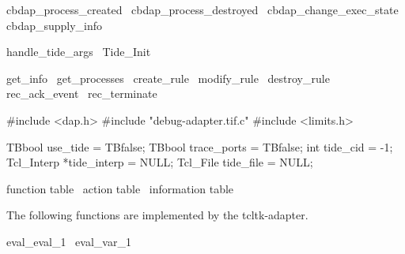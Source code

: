 \LA{}cbdap_process_created~{\nwtagstyle{}}\RA{}
\LA{}cbdap_process_destroyed~{\nwtagstyle{}}\RA{}
\LA{}cbdap_change_exec_state~{\nwtagstyle{}}\RA{}
\LA{}cbdap_supply_info~{\nwtagstyle{}}\RA{}

\LA{}handle_tide_args~{\nwtagstyle{}}\RA{}
\LA{}Tide_Init~{\nwtagstyle{}}\RA{}

\LA{}get_info~{\nwtagstyle{}}\RA{}
\LA{}get_processes~{\nwtagstyle{}}\RA{}
\LA{}create_rule~{\nwtagstyle{}}\RA{}
\LA{}modify_rule~{\nwtagstyle{}}\RA{}
\LA{}destroy_rule~{\nwtagstyle{}}\RA{}
\LA{}rec_ack_event~{\nwtagstyle{}}\RA{}
\LA{}rec_terminate~{\nwtagstyle{}}\RA{}
\nwendcode{}\nwdocspar


\nwenddocs{}\endmoddef
#include <dap.h>
#include "debug-adapter.tif.c"
#include <limits.h>
\nwendcode{}\nwdocspar


\nwenddocs{}\endmoddef
TBbool use_tide = TBfalse;
TBbool trace_ports = TBfalse;
int tide_cid = -1;
Tcl_Interp *tide_interp = NULL;
Tcl_File tide_file = NULL;

\LA{}function table~{\nwtagstyle{}}\RA{}
\LA{}action table~{\nwtagstyle{}}\RA{}
\LA{}information table~{\nwtagstyle{}}\RA{}
\nwendcode{}\nwdocspar


The following functions are implemented by the tcltk-adapter.

\nwenddocs{}\endmoddef
\LA{}eval_eval_1~{\nwtagstyle{}}\RA{}
\LA{}eval_var_1~{\nwtagstyle{}}\RA{}

